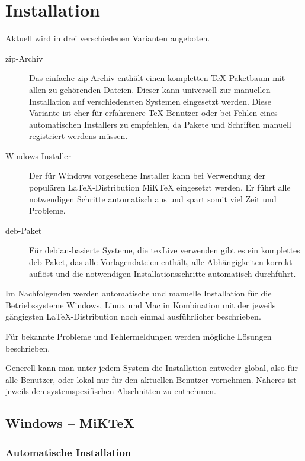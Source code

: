 \chapter{Installation}\label{chap:install}

Aktuell wird \tubslatex in drei verschiedenen Varianten angeboten.

\begin{description}
  \item[zip-Archiv]
    Das einfache zip-Archiv enthält einen kompletten \TeX-Paketbaum mit
    allen zu \tubslatex gehörenden Dateien.
    Dieser kann universell zur manuellen Installation auf verschiedensten
    Systemen eingesetzt werden.
    Diese Variante ist eher für erfahrenere \TeX-Benutzer oder bei
    Fehlen eines automatischen Installers zu empfehlen, da Pakete
    und Schriften manuell registriert werdens müssen.
  \item[Windows-Installer]
    Der für Windows vorgesehene Installer kann bei Verwendung der
    populären \LaTeX-Distribution MiKTeX eingesetzt werden.
    Er führt alle notwendigen Schritte automatisch aus und spart somit
    viel Zeit und Probleme.
  \item[deb-Paket]
    Für debian-basierte Systeme, die texLive verwenden gibt es
    ein komplettes deb-Paket, das alle Vorlagendateien enthält,
    alle Abhängigkeiten korrekt auflöst und die notwendigen
    Installationsschritte automatisch durchführt.
\end{description}

Im Nachfolgenden werden automatische und manuelle Installation für
die Betriebssysteme Windows, Linux und Mac in Kombination mit der
jeweils gängigsten \LaTeX-Distribution noch einmal ausführlicher
beschrieben.

Für bekannte Probleme und Fehlermeldungen werden mögliche Lösungen beschrieben.

Generell kann man unter jedem System die Installation entweder global, 
also für alle Benutzer, oder lokal nur für den aktuellen Benutzer vornehmen.
Näheres ist jeweils den systemspezifischen Abschnitten zu entnehmen.


\clearpage
\section{Windows -- MiKTeX}

\subsection{Automatische Installation}


